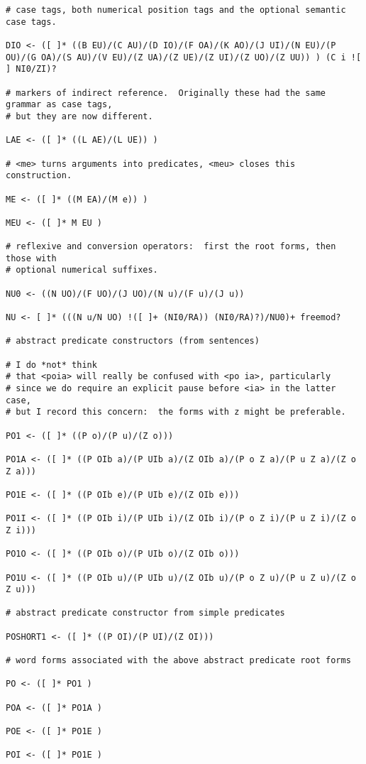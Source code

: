\documentclass[12pt]{book}
\begin{document}
{\begin{verbatim}
# case tags, both numerical position tags and the optional semantic case tags.

DIO <- ([ ]* ((B EU)/(C AU)/(D IO)/(F OA)/(K AO)/(J UI)/(N EU)/(P OU)/(G OA)/(S AU)/(V EU)/(Z UA)/(Z UE)/(Z UI)/(Z UO)/(Z UU)) ) (C i ![ ] NI0/ZI)?

# markers of indirect reference.  Originally these had the same grammar as case tags,
# but they are now different.

LAE <- ([ ]* ((L AE)/(L UE)) )

# <me> turns arguments into predicates, <meu> closes this construction.

ME <- ([ ]* ((M EA)/(M e)) )

MEU <- ([ ]* M EU )

# reflexive and conversion operators:  first the root forms, then those with
# optional numerical suffixes.

NU0 <- ((N UO)/(F UO)/(J UO)/(N u)/(F u)/(J u))

NU <- [ ]* (((N u/N UO) !([ ]+ (NI0/RA)) (NI0/RA)?)/NU0)+ freemod?

# abstract predicate constructors (from sentences)

# I do *not* think
# that <poia> will really be confused with <po ia>, particularly
# since we do require an explicit pause before <ia> in the latter case,
# but I record this concern:  the forms with z might be preferable.

PO1 <- ([ ]* ((P o)/(P u)/(Z o)))

PO1A <- ([ ]* ((P OIb a)/(P UIb a)/(Z OIb a)/(P o Z a)/(P u Z a)/(Z o Z a)))

PO1E <- ([ ]* ((P OIb e)/(P UIb e)/(Z OIb e)))

PO1I <- ([ ]* ((P OIb i)/(P UIb i)/(Z OIb i)/(P o Z i)/(P u Z i)/(Z o Z i)))

PO1O <- ([ ]* ((P OIb o)/(P UIb o)/(Z OIb o)))

PO1U <- ([ ]* ((P OIb u)/(P UIb u)/(Z OIb u)/(P o Z u)/(P u Z u)/(Z o Z u)))

# abstract predicate constructor from simple predicates

POSHORT1 <- ([ ]* ((P OI)/(P UI)/(Z OI)))

# word forms associated with the above abstract predicate root forms

PO <- ([ ]* PO1 )

POA <- ([ ]* PO1A )

POE <- ([ ]* PO1E )

POI <- ([ ]* PO1E )


\end{verbatim}}
\end{document}
